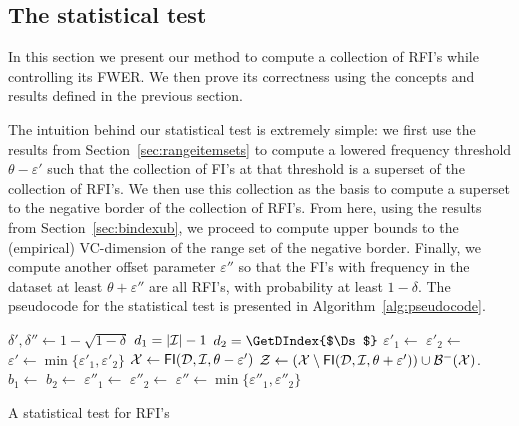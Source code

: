 \subsection{The statistical test}\label{sec:realfisalgo}
In this section we present our method to compute a collection of RFI's while
controlling its FWER. We then prove its correctness using the concepts and
results defined in the previous section.

The intuition behind our statistical test is extremely simple: we first use the
results from Section~\ref{sec:rangeitemsets} to compute a lowered frequency threshold
$\theta-\varepsilon'$ such that the collection of FI's at that threshold is a
superset of the collection of RFI's. We then use this collection as the basis to
compute a superset to the negative border of the collection of RFI's. From here,
using the results from Section~\ref{sec:bindexub}, we proceed to compute upper
bounds to the (empirical) VC-dimension of the range set of the negative border.
Finally, we compute another offset parameter $\varepsilon''$ so that the FI's
with frequency in the dataset at least $\theta+\varepsilon''$ are all RFI's,
with probability at least $1-\delta$. The pseudocode for the statistical test is
presented in Algorithm~\ref{alg:pseudocode}.

\begin{algorithm}[ht]
  \DontPrintSemicolon
  $\delta',\delta''\leftarrow 1-\sqrt{1-\delta}$\; 
  $d_1 = |{\cal I}|-1$\;
  $d_2 = \GetDIndex{$\Ds$}$\;
  $\varepsilon'_1\leftarrow$ \;\label{algline:epsVC}
  $\varepsilon'_2\leftarrow$ \;\label{algline:epsEVC}
  $\varepsilon'\leftarrow\min\{\varepsilon'_1,\varepsilon'_2\}$\;
  $\mathcal{X}\leftarrow\mathsf{FI}({\cal D},{\cal I},\theta-\varepsilon')$\;\label{algline:mining}
  $\mathcal{Z}\leftarrow (\mathcal{X} \setminus \mathsf{FI}({\cal D},{\cal I},\theta+\varepsilon')) \cup
  \mathcal{B}^-(\mathcal{X})$.\;\label{algline:candidates}
  $b_1\leftarrow$
  \;\label{algline:ASUKP}
  $b_2\leftarrow$
  \;\label{algline:empASUKP}
  $\varepsilon''_1\leftarrow$ \;
  $\varepsilon''_2 \leftarrow$ \;
  $\varepsilon''\leftarrow\min\{\varepsilon''_1,\varepsilon''_2\}$\;
  \;
  \caption{A statistical test for RFI's}\label{alg:pseudocode}
\end{algorithm}

